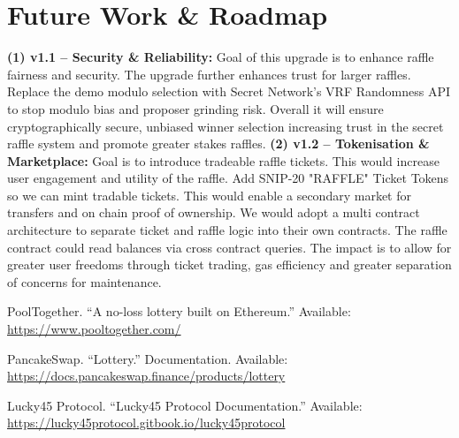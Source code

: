 \documentclass{article}
\begin{document}
\section{Future Work \& Roadmap}

\textbf{(1) v1.1 – Security \& Reliability:} Goal of this upgrade is to enhance raffle fairness and security. The upgrade further enhances trust for larger raffles. Replace the demo modulo selection with Secret Network's VRF Randomness API to stop modulo bias and proposer grinding risk. Overall it will ensure cryptographically secure, unbiased winner selection increasing trust in the secret raffle system and promote greater stakes raffles. \textbf{(2) v1.2 – Tokenisation \& Marketplace:} Goal is to introduce tradeable raffle tickets. This would increase user engagement and utility of the raffle. Add SNIP-20 "RAFFLE" Ticket Tokens so we can mint tradable tickets. This would enable a secondary market for transfers and on chain proof of ownership. We would adopt a multi contract architecture to separate ticket and raffle logic into their own contracts. The raffle contract could read balances via cross contract queries. The impact is to allow for greater user freedoms through ticket trading, gas efficiency and greater separation of concerns for maintenance.

{\small
\begin{thebibliography}{9}

PoolTogether. ``A no-loss lottery built on Ethereum.'' Available: \url{https://www.pooltogether.com/}

PancakeSwap. ``Lottery.'' Documentation. Available: \url{https://docs.pancakeswap.finance/products/lottery}

Lucky45 Protocol. ``Lucky45 Protocol Documentation.'' Available: \url{https://lucky45protocol.gitbook.io/lucky45protocol}
\end{thebibliography}}

\newpage

\end{document}
